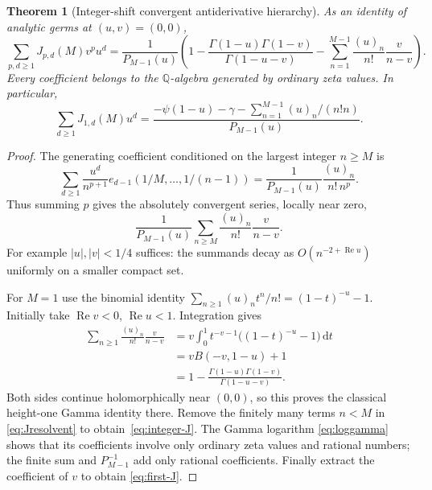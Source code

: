 \documentclass[11pt,oneside]{article}
\numberwithin{equation}{section}
\newtheorem{theorem}{Theorem}[section]
\theoremstyle{definition}
\theoremstyle{remark}
\DeclareMathOperator{\Rea}{Re}
\newcommand{\dd}{\,\mathrm d}
\newcommand{\Q}{\mathbb Q}
\begin{document}
\begin{theorem}[Integer-shift convergent antiderivative hierarchy]
\label{thm:integer-primitives}
As an identity of analytic germs at $(u,v)=(0,0)$,
\begin{equation}\label{eq:integer-J}
\boxed{\displaystyle
\sum_{p,d\ge1}J_{p,d}(M)v^p u^d
=\frac{1}{P_{M-1}(u)}
 \left(1-\frac{\Gamma(1-u)\Gamma(1-v)}{\Gamma(1-u-v)}
       -\sum_{n=1}^{M-1}\frac{(u)_n}{n!}\frac{v}{n-v}\right).}
\end{equation}
Every coefficient belongs to the $\Q$-algebra generated by ordinary zeta
values. In particular,
\begin{equation}\label{eq:first-J}
\sum_{d\ge1}J_{1,d}(M)u^d
=\frac{-\psi(1-u)-\gamma
             -\sum_{n=1}^{M-1}(u)_n/(n!n)}{P_{M-1}(u)}.
\end{equation}
\end{theorem}

\begin{proof}
The generating coefficient conditioned on the largest integer $n\ge M$ is
\[
\sum_{d\ge1}\frac{u^d}{n^{p+1}}
 e_{d-1}(1/M,\ldots,1/(n-1))
=\frac1{P_{M-1}(u)}\frac{(u)_n}{n!\,n^p}.
\]
Thus summing $p$ gives the absolutely convergent series, locally near zero,
\begin{equation}\label{eq:Jresolvent}
\frac1{P_{M-1}(u)}\sum_{n\ge M}\frac{(u)_n}{n!}\frac{v}{n-v}.
\end{equation}
For example $|u|,|v|<1/4$ suffices: the summands decay as
$O(n^{-2+\Rea u})$ uniformly on a smaller compact set.

For $M=1$ use the binomial identity
$\sum_{n\ge1}(u)_nt^n/n!=(1-t)^{-u}-1$. Initially take $\Rea v<0$,
$\Rea u<1$. Integration gives
\begin{align*}
\sum_{n\ge1}\frac{(u)_n}{n!}\frac{v}{n-v}
 &=v\int_0^1t^{-v-1}\bigl((1-t)^{-u}-1\bigr)\dd t\\
 &=vB(-v,1-u)+1\\
 &=1-\frac{\Gamma(1-u)\Gamma(1-v)}{\Gamma(1-u-v)}.
\end{align*}
Both sides continue holomorphically near $(0,0)$, so this proves the classical
height-one Gamma identity there. Remove the finitely many terms $n<M$ in
\eqref{eq:Jresolvent} to obtain~\eqref{eq:integer-J}. The Gamma logarithm
\eqref{eq:loggamma} shows that its coefficients involve only ordinary zeta
values and rational numbers; the finite sum and $P_{M-1}^{-1}$ add only
rational coefficients. Finally extract the coefficient of $v$ to obtain
\eqref{eq:first-J}.
\end{proof}
\end{document}
